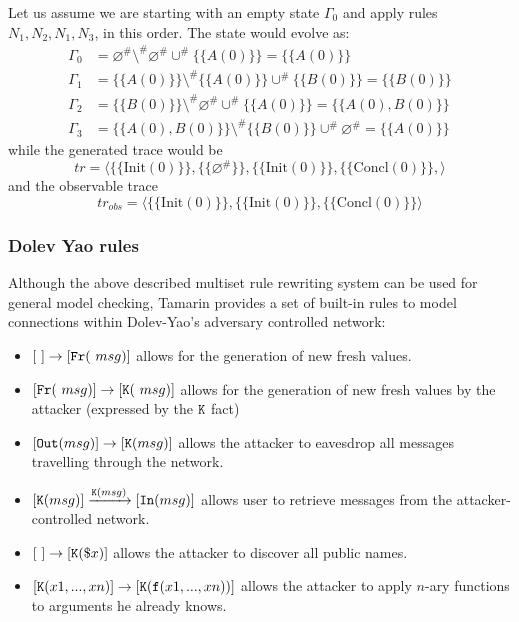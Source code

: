 \documentclass{article}
\newcommand{\mono}[1]{\textrm{\tt #1}}
\begin{document}
Let us assume we are starting with an empty state $\Gamma_0$ and apply rules $N_1, N_2, N_1, N_3$, in this order. The state would evolve as:
\begin{align*}
    \Gamma_0 &= \varnothing^{\#} \setminus^{\#} \varnothing^{\#} \cup^{\#} \{\{A(0)\}\} = \{\{A(0)\}\}\\
    \Gamma_1 &= \{\{A(0)\}\} \setminus^{\#} \{\{A(0)\}\} \cup^{\#} \{\{B(0)\}\} = \{\{B(0)\}\}\\
    \Gamma_2 &= \{\{B(0)\}\} \setminus^{\#} \varnothing^{\#} \cup^{\#} \{\{A(0)\}\} = \{\{A(0), B(0)\}\}\\
    \Gamma_3 &= \{\{A(0), B(0)\}\} \setminus^{\#} \{\{B(0)\}\} \cup^{\#} \varnothing^{\#} = \{\{A(0)\}\}
\end{align*}
while the generated trace would be
\begin{equation*}
    tr = \langle \{\{\textrm{Init}(0)\}\}, \{\{\varnothing^{\#}\}\}, \{\{\textrm{Init}(0)\}\}, \{\{\textrm{Concl}(0)\}\},\rangle
\end{equation*}
and the observable trace
\begin{equation*}
    tr_{obs} = \langle \{\{\textrm{Init}(0)\}\}, \{\{\textrm{Init}(0)\}\}, \{\{\textrm{Concl}(0)\}\}\rangle
\end{equation*}

\subsubsection{Dolev Yao rules}
Although the above described multiset rule rewriting system can be used for general model checking, Tamarin provides a set of built-in rules to model connections within Dolev-Yao's adversary controlled network:

\begin{itemize}
    \item $[ \ ] \to [ \mono{Fr}(~msg) ]$ allows for the generation of new fresh values.
    \item $[ \mono{Fr}(~msg) ] \to [ \mono{K}(~msg) ]$ allows for the generation of new fresh values by the attacker (expressed by the $\mono{K}$ fact)
    \item $[ \mono{Out}(msg) ] \to [ \mono{K}(msg) ]$ allows the attacker to eavesdrop all messages travelling through the network. 
    \item $[ \mono{K}(msg) ] \xrightarrow{\mono{K}(msg)} [ \mono{In}(msg) ]$ allows user to retrieve messages from the attacker-controlled network.
    \item $[ \ ] \to [ \mono{K}(\$x) ]$ allows the attacker to discover all public names.
    \item $[ \mono{K}(x1,...,xn) ] \to [ \mono{K}(\mono{f}(x1,...,xn)) ]$ allows the attacker to apply $n$-ary functions to arguments he already knows.
\end{itemize}
\end{document}
